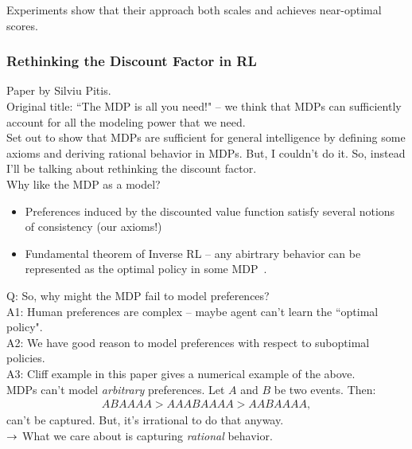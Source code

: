Experiments show that their approach both scales and achieves near-optimal scores.

\spacerule
\subsubsection{Rethinking the Discount Factor in RL~\cite{pitis2019rethinking}}

Paper by Silviu Pitis. \\

Original title: ``The MDP is all you need!" -- we think that MDPs can sufficiently account for all the modeling power that we need. \\

Set out to show that MDPs are sufficient for general intelligence by defining some axioms and deriving rational behavior in MDPs. But, I couldn't do it. So, instead I'll be talking about rethinking the discount factor. \\

Why like the MDP as a model?
\begin{itemize}
    \item Preferences induced by the discounted value function satisfy several notions of consistency (our axioms!)
    \item Fundamental theorem of Inverse RL -- any abirtrary behavior can be represented as the optimal policy in some MDP~\cite{ng2000algorithms}.
\end{itemize}

Q: So, why might the MDP fail to model preferences? \\

A1: Human preferences are complex -- maybe agent can't learn the ``optimal policy". \\

A2: We have good reason to model preferences with respect to suboptimal policies. \\

A3: Cliff example in this paper gives a numerical example of the above. \\

MDPs can't model {\it arbitrary} preferences. Let $A$ and $B$ be two events. Then:
\begin{align}
    ABAAAA > AAABAAAA  > AABAAAA,
\end{align}
can't be captured. But, it's irrational to do that anyway.\\

$\rightarrow$ What we care about is capturing {\it rational} behavior. \\

